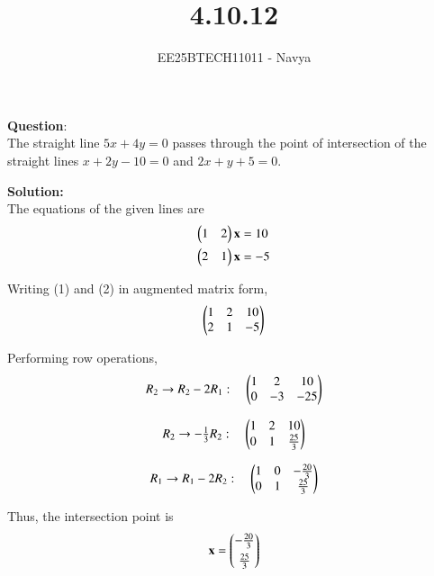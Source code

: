 \documentclass[journal]{IEEEtran}
\begin{document}

\vspace{3cm}

\title{4.10.12}
\author{EE25BTECH11011 - Navya}
{\let\newpage\relax\maketitle}

\renewcommand{\thefigure}{\theenumi}
\renewcommand{\thetable}{\theenumi}
\setlength{\intextsep}{10pt} %
\textbf{Question}:\\
 The straight line $5x+4y=0$ passes through the point of intersection of the straight lines $x+2y-10 = 0$ and $2x+y+5 = 0$.
 
\textbf{Solution:}\\
The equations of the given lines are
\begin{align}
    \begin{pmatrix}1 & 2\end{pmatrix}\mathbf{x} &= 10 \label{eq1}\\
    \begin{pmatrix}2 & 1\end{pmatrix}\mathbf{x} &= -5 \label{eq2}
\end{align}

Writing (1) and (2) in augmented matrix form,
\begin{align}
\begin{pmatrix}1 & 2 & 10\\ 2 & 1 & -5\end{pmatrix}
\end{align}

Performing row operations,
\begin{align}
R_2 \to R_2 - 2R_1 :\quad
\begin{pmatrix}1 & 2 & 10 \\ 0 & -3 & -25\end{pmatrix}
\end{align}

\begin{align}
R_2 \to -\tfrac{1}{3}R_2 :\quad
\begin{pmatrix}1 & 2 & 10 \\ 0 & 1 & \tfrac{25}{3}\end{pmatrix}
\end{align}

\begin{align}
R_1 \to R_1 - 2R_2 :\quad
\begin{pmatrix}1 & 0 & -\tfrac{20}{3} \\ 0 & 1 & \tfrac{25}{3}\end{pmatrix}
\end{align}

Thus, the intersection point is
\begin{align}
\mathbf{x} = \begin{pmatrix}-\tfrac{20}{3}\\[4pt]\tfrac{25}{3}\end{pmatrix}
\end{align}
\end{document}
